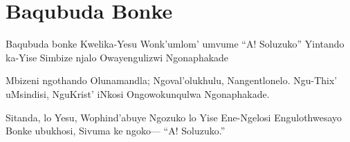 \starttocol
\chapter{Baqubuda Bonke}
\nexttocol
\hfill{\it }
\stoptocol
\starttocol
\startlines
{\sc Baqubuda} bonke
Kwelika-Yesu 
Wonk'umlom' umvume
``A! Soluzuko''
Yintando ka-Yise
Simbize njalo
Owayengulizwi
Ngonaphakade 

Mbizeni ngothando
Olunamandla;
Ngoval'olukhulu,
Nangentlonelo. 
Ngu-Thix' uMsindisi,
NguKrist' iNkosi
Ongowokunqulwa
Ngonaphakade.

Sitanda, lo Yesu,
Wophind'abuye
Ngozuko lo Yise
Ene-Ngelosi
Engulothwesayo
Bonke ubukhosi,
Sivuma ke ngoko---
``A! Soluzuko.''

\stoplines
\nexttocol

\stoptocol
